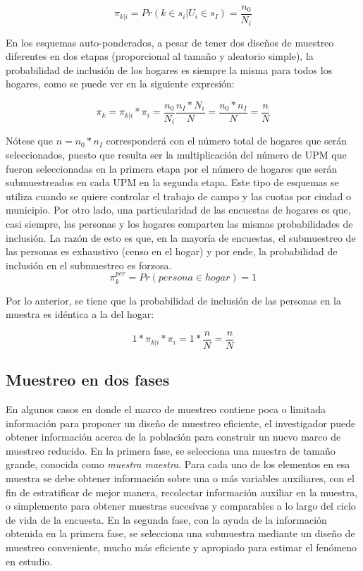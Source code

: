 \documentclass[
  10pt,
  spanish,
]{book}
\begin{document}
\[\pi_{k|i} = Pr(k \in s_i | U_i \in s_I ) = \frac{n_0}{N_i}\]

En los esquemas auto-ponderados, a pesar de tener dos diseños de muestreo diferentes en dos etapas (proporcional al tamaño y aleatorio simple), la probabilidad de inclusión de los hogares es siempre la misma para todos los hogares, como se puede ver en la siguiente expresión:

\[\pi_k = \pi_{k|i} * \pi_i = \frac{n_0}{N_i} \frac{n_I* N_i}{N} = \frac{n_0*n_I}{N} = \frac{n}{N}\]

Nótese que \(n = n_0 * n_I\) corresponderá con el número total de hogares que serán seleccionados, puesto que resulta ser la multiplicación del número de UPM que fueron seleccionadas en la primera etapa por el número de hogares que serán submuestreados en cada UPM en la segunda etapa. Este tipo de esquemas se utiliza cuando se quiere controlar el trabajo de campo y las cuotas por ciudad o municipio. Por otro lado, una particularidad de las encuestas de hogares es que, casi siempre, las personas y los hogares comparten las mismas probabilidades de inclusión. La razón de esto es que, en la mayoría de encuestas, el submuestreo de las personas es exhaustivo (censo en el hogar) y por ende, la probabilidad de inclusión en el submuestreo es forzosa.
\[\pi_k^{per} = Pr(persona \in hogar) =  1\]

Por lo anterior, se tiene que la probabilidad de inclusión de las personas en la muestra es idéntica a la del hogar:

\[1 * \pi_{k|i} * \pi_i = 1 * \frac{n}{N} = \frac{n}{N}\]

\hypertarget{muestreo-en-dos-fases}{%
\subsection*{Muestreo en dos fases}\label{muestreo-en-dos-fases}}

En algunos casos en donde el marco de muestreo contiene poca o limitada información para proponer un diseño de muestreo eficiente, el investigador puede obtener información acerca de la población para construir un nuevo marco de muestreo reducido. En la primera fase, se selecciona una muestra de tamaño grande, conocida como \emph{muestra maestra}. Para cada uno de los elementos en esa muestra se debe obtener información sobre una o más variables auxiliares, con el fin de estratificar de mejor manera, recolectar información auxiliar en la muestra, o simplemente para obtener muestras sucesivas y comparables a lo largo del ciclo de vida de la encuesta. En la segunda fase, con la ayuda de la información obtenida en la primera fase, se selecciona una submuestra mediante un diseño de muestreo conveniente, mucho más eficiente y apropiado para estimar el fenómeno en estudio.
\end{document}
